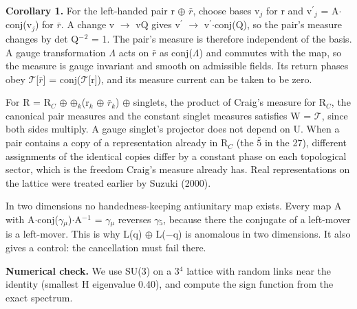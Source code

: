 \documentclass[
]{article}
\begin{document}
\textbf{Corollary 1.} For the left-handed pair r \ensuremath{\oplus} \ensuremath{\bar{r}}, choose bases v\ensuremath{_{j}}
for r and v\ensuremath{^{\prime}}\ensuremath{_{j}} = A\ensuremath{\cdot}conj(v\ensuremath{_{j}}) for \ensuremath{\bar{r}}. A change v \ensuremath{\to} vQ gives v\ensuremath{^{\prime}} \ensuremath{\to}
v\ensuremath{^{\prime}}\ensuremath{\cdot}conj(Q), so the pair's measure changes by \textbar det Q\textbar\ensuremath{^{-}}\ensuremath{^{2}} =
1. The pair's measure is therefore independent of the basis. A gauge
transformation \ensuremath{\Lambda} acts on \ensuremath{\bar{r}} as conj(\ensuremath{\Lambda}) and commutes with the map, so the
measure is gauge invariant and smooth on admissible fields. Its return
phases obey \ensuremath{\mathcal{T}}{[}\ensuremath{\bar{r}}{]} = conj(\ensuremath{\mathcal{T}}{[}r{]}), and its measure current can be
taken to be zero.

For R = R\ensuremath{_{C}} \ensuremath{\oplus} \ensuremath{\oplus}\ensuremath{_{k}}(r\ensuremath{_{k}} \ensuremath{\oplus} \ensuremath{\bar{r}}\ensuremath{_{k}}) \ensuremath{\oplus} singlets, the product of Craig's measure
for R\ensuremath{_{C}}, the canonical pair measures and the constant singlet measures
satisfies W = \ensuremath{\mathcal{T}}, since both sides multiply. A gauge singlet's projector
does not depend on U. When a pair contains a copy of a representation
already in R\ensuremath{_{C}} (the \ensuremath{\bar{5}} in the 27), different assignments of the
identical copies differ by a constant phase on each topological sector,
which is the freedom Craig's measure already has. Real representations
on the lattice were treated earlier by Suzuki (2000).

In two dimensions no handedness-keeping antiunitary map exists. Every
map A with A\ensuremath{\cdot}conj(\ensuremath{\gamma}\ensuremath{_{\ensuremath{\mu}}})\ensuremath{\cdot}A\ensuremath{^{-}}\ensuremath{^{1}} = \ensuremath{\gamma}\ensuremath{_{\ensuremath{\mu}}} reverses \ensuremath{\gamma}\ensuremath{_{5}}, because there the
conjugate of a left-mover is a left-mover. This is why L(q) \ensuremath{\oplus} L(\ensuremath{-}q) is
anomalous in two dimensions. It also gives a control: the cancellation
must fail there.

\textbf{Numerical check.} We use SU(3) on a 3\ensuremath{^{4}} lattice with random links
near the identity (smallest \textbar H\textbar{} eigenvalue 0.40), and
compute the sign function from the exact spectrum.
\end{document}
